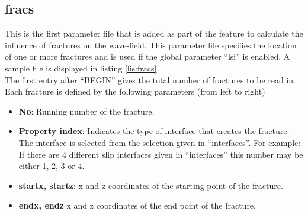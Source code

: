     \subsection{fracs}
    \label{subsec:fracs}
    	This is the first parameter file that is added as part of the feature to calculate the influence of fractures on the wave-field. This parameter file specifies the location of one or more fractures and is used if the global parameter ``lsi'' is enabled. A sample file is displayed in listing \ref{lis:fracs}.
    	 \\
    	The first entry after ``BEGIN'' gives the total number of fractures to be read in. \\
    	Each fracture is defined by the following parameters (from left to right)
    	\begin{itemize}
    		\item \textbf{No}: Running number of the fracture.
    		\item \textbf{Property index}: Indicates the type of interface that creates the fracture. The interface is selected from the selection given in ``interfaces''. For example: If there are 4 different slip interfaces given in ``interfaces'' this number may be either 1, 2, 3 or 4. 
    		\item \textbf{startx, startz}: x and z coordinates of the starting point of the fracture.
    		\item \textbf{endx, endz} x and z coordinates of the end point of the fracture.
    	\end{itemize}
